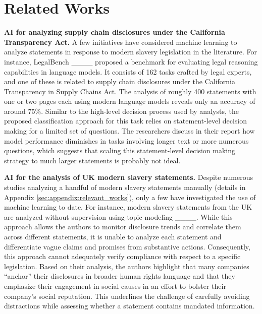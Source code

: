 \section{Related Works}
\label{sec:relworks}


\textbf{AI for analyzing supply chain disclosures under the California Transparency Act.} A few initiatives have considered machine learning to analyze statements in response to modern slavery legislation in the literature. For instance, LegalBench ____ proposed a benchmark for evaluating legal reasoning capabilities in language models. It consists of 162 tasks crafted by legal experts, and one of these is related to supply chain disclosures under the California Transparency in Supply Chains Act. The analysis of roughly 400 statements with one or two pages each using modern language models reveals only an accuracy of around 75\%. Similar to the high-level decision process used by analysts, the proposed classification approach for this task relies on statement-level decision making for a limited set of questions. The researchers discuss in their report how model performance diminishes in tasks involving longer text or more numerous questions, which suggests that scaling this statement-level decision making strategy to much larger statements is probably not ideal.

\textbf{AI for the analysis of UK modern slavery statements.} Despite numerous studies analyzing a handful of modern slavery statements manually (details in Appendix \ref{sec:appendix:relevant_works}), only a few have investigated the use of machine learning to date. For instance, modern slavery statements from the UK are analyzed without supervision using topic modeling ____. While this approach allows the authors to monitor disclosure trends and correlate them across different statements, it is unable to analyze each statement and differentiate vague claims and promises from substantive actions. Consequently, this approach cannot adequately verify compliance with respect to a specific legislation. Based on their analysis, the authors highlight that many companies ``anchor'' their disclosures in broader human rights language and that they emphasize their engagement in social causes in an effort to bolster their company's social reputation. This underlines the challenge of carefully avoiding distractions while assessing whether a statement contains mandated information.

